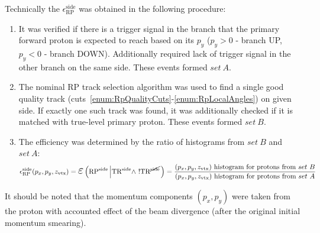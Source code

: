 Technically the $\epsilon_{\text{RP}}^{\text{side}}$ was obtained in the following procedure:
\begin{enumerate}
	\item It was verified if there is a trigger signal in the branch that the primary forward proton is expected to reach based on its $p_{y}$ ($p_{y}>0$ - branch UP, $p_{y}<0$ - branch DOWN). Additionally required lack of trigger signal in the other branch on the same side. These events formed $set~A$.
	\item The nominal RP track selection algorithm was used to find a single good quality track (cuts~\ref{enum:RpQualityCuts}-\ref{enum:RpLocalAngles}) on given side. If exactly one such track was found, it was additionally checked if it is matched with true-level primary proton. These events formed $set~B$.
	\item The efficiency was determined by the ratio of histograms from $set~B$ and $set~A$:
	\begin{equation}\label{eq:rpEffDef}
 \epsilon_{\text{RP}}^{\text{side}}(p_{x}, p_{y}, z_{\text{vtx}}) = \mbox{\LARGE$\varepsilon$}\left(\RPSIDE\left|\TRSIDE\land~!\TRNSIDE\right.\right) = %
 \frac{(p_{x}, p_{y}, z_{\text{vtx}})~\text{histogram for protons from}~set~B}{(p_{x}, p_{y}, z_{\text{vtx}})~\text{histogram for protons from}~set~A}
  \end{equation}
	
\end{enumerate}

It should be noted that the momentum components $(p_{x}, p_{y})$ were taken from the proton with accounted effect of the beam divergence (after the original initial momentum smearing).

